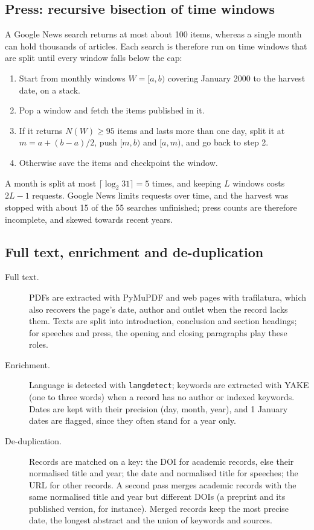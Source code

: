 \documentclass[11pt,a4paper]{article}
\begin{document}
\subsection{Press: recursive bisection of time windows}
A Google News search returns at most about 100 items, whereas a single month can hold thousands of articles. Each search is therefore run on time windows that are split until every window falls below the cap:
\begin{enumerate}
\item Start from monthly windows $W = [a, b)$ covering January 2000 to the harvest date, on a stack.
\item Pop a window and fetch the items published in it.
\item If it returns $N(W) \ge 95$ items and lasts more than one day, split it at $m = a + (b-a)/2$, push $[m, b)$ and $[a, m)$, and go back to step 2.
\item Otherwise save the items and checkpoint the window.
\end{enumerate}
A month is split at most $\lceil \log_2 31 \rceil = 5$ times, and keeping $L$ windows costs $2L - 1$ requests. Google News limits requests over time, and the harvest was stopped with about 15 of the 55 searches unfinished; press counts are therefore incomplete, and skewed towards recent years.

\subsection{Full text, enrichment and de-duplication}
\begin{description}
\item[Full text.] PDFs are extracted with PyMuPDF and web pages with trafilatura, which also recovers the page's date, author and outlet when the record lacks them. Texts are split into introduction, conclusion and section headings; for speeches and press, the opening and closing paragraphs play these roles.
\item[Enrichment.] Language is detected with \texttt{langdetect}; keywords are extracted with YAKE (one to three words) when a record has no author or indexed keywords. Dates are kept with their precision (day, month, year), and 1 January dates are flagged, since they often stand for a year only.
\item[De-duplication.] Records are matched on a key: the DOI for academic records, else their normalised title and year; the date and normalised title for speeches; the URL for other records. A second pass merges academic records with the same normalised title and year but different DOIs (a preprint and its published version, for instance). Merged records keep the most precise date, the longest abstract and the union of keywords and sources.
\end{description}
\end{document}
